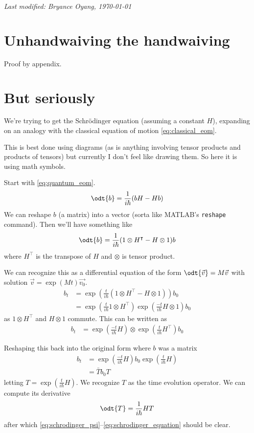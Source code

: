 \documentclass[12pt, oneside, letterpaper, fleqn]{article}
\begin{document}
\hfill \emph{Last modified: Bryance Oyang, \today}

\begin{appendices}
\section{Unhandwaiving the handwaiving}\label{app:complicated}
Proof by appendix.

\section{But seriously}
We're trying to get the Schr\"odinger equation (assuming a constant
$H$), expanding on an analogy with the classical equation of motion
\eqref{eq:classical_eom}.

This is best done using diagrams (as is anything involving tensor
products and products of tensors) but currently I don't feel like
drawing them. So here it is using math symbols.

Start with \eqref{eq:quantum_eom}.
\begin{align*}
\odt{b} = \frac{1}{i\hbar}(bH - Hb)
\end{align*}
We can reshape $b$ (a matrix) into a vector (sorta like MATLAB's
\texttt{reshape} command). Then we'll have something like
\begin{align*}
\odt{b} = \frac{1}{i\hbar}(1\otimes H^\intercal - H\otimes 1)b
\end{align*}
where $H^\intercal$ is the transpose of $H$ and $\otimes$ is tensor product.

We can recognize this as a differential equation of the form
$\odt{\vec{v}} = M\vec{v}$ with solution $\vec{v} = \exp(Mt)\vec{v_0}$.
\begin{align*}
b_t &= \exp\left(\frac{t}{i\hbar}(1\otimes H^\intercal - H\otimes 1)\right)b_0\\
&= \exp\left(\frac{t}{i\hbar}1\otimes H^\intercal\right)
\exp\left(\frac{-t}{i\hbar}H\otimes 1\right)b_0
\end{align*}
as $1\otimes H^\intercal$ and $H\otimes 1$ commute. This can be written as
\begin{align*}
b_t &= \exp\left(\frac{-t}{i\hbar}H\right)
\otimes\exp\left(\frac{t}{i\hbar}H^\intercal\right)b_0
\end{align*}

Reshaping this back into the original form where $b$ was a matrix
\begin{align*}
b_t &= \exp\left(\frac{-t}{i\hbar}H\right) b_0
\exp\left(\frac{t}{i\hbar}H\right)\\
&= \bar{T} b_0 T
\end{align*}
letting $T = \exp\left(\frac{t}{i\hbar}H\right)$. We recognize $T$ as
the time evolution operator. We can compute its derivative
\begin{align*}
\odt{T} = \frac{1}{i\hbar} HT
\end{align*}
after which \eqref{eq:schrodinger_psi}--\eqref{eq:schrodinger_equation}
should be clear.
\end{appendices}
\end{document}
